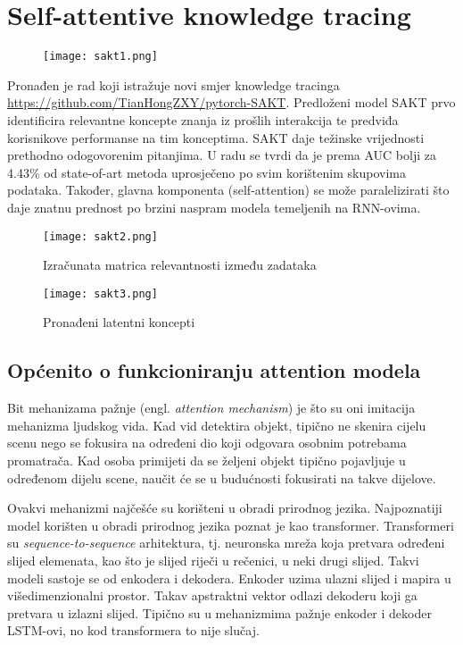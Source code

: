 
\chapter{Self-attentive knowledge tracing}
	\begin{figure}[!htb]
		\centering
		\texttt{[image: sakt1.png]}
		\caption{}
		\label{}
	\end{figure}
	Pronađen je rad koji istražuje novi smjer knowledge tracinga \url{https://github.com/TianHongZXY/pytorch-SAKT}. Predloženi model SAKT prvo identificira relevantne koncepte znanja iz prošlih interakcija te predviđa korisnikove performanse na tim konceptima. SAKT daje težinske vrijednosti prethodno odogovorenim pitanjima. U radu se tvrdi da je prema AUC bolji za 4.43\% od state-of-art metoda uprosječeno po svim korištenim skupovima podataka. Također, glavna komponenta (self-attention) se može paralelizirati što daje znatnu prednost po brzini naspram modela temeljenih na RNN-ovima.

		\begin{figure}[H]
		\centering
		\texttt{[image: sakt2.png]}
		\caption{Izračunata matrica relevantnosti između zadataka}
		\label{}
	\end{figure}
	\begin{figure}[!htb]
	\centering
	\texttt{[image: sakt3.png]}
	\caption{Pronađeni latentni koncepti}
	\label{}
\end{figure}

	\section{Općenito o funkcioniranju attention modela}

	Bit mehanizama pažnje (engl. \textit{attention mechanism}) je što su oni imitacija mehanizma ljudskog vida. Kad vid detektira objekt, tipično ne skenira cijelu scenu nego se fokusira na određeni dio koji odgovara osobnim potrebama promatrača. Kad osoba primijeti da se željeni objekt tipično pojavljuje u određenom dijelu scene, naučit će se u budućnosti fokusirati na takve dijelove.

	Ovakvi mehanizmi najčešće su korišteni u obradi prirodnog jezika. Najpoznatiji model korišten u obradi prirodnog jezika poznat je kao transformer. Transformeri su \textit{sequence-to-sequence} arhitektura, tj. neuronska mreža koja pretvara određeni slijed elemenata, kao što je slijed riječi u rečenici, u neki drugi slijed. Takvi modeli sastoje se od enkodera i dekodera. Enkoder uzima ulazni slijed i mapira u višedimenzionalni prostor. Takav apstraktni vektor odlazi dekoderu koji ga pretvara u izlazni slijed. Tipično su u mehanizmima pažnje enkoder i dekoder LSTM-ovi, no kod transformera to nije slučaj.


